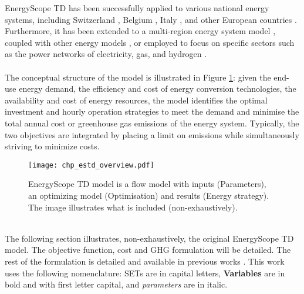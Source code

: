 EnergyScope TD has been successfully applied to various national energy systems, including Switzerland \cite{Limpens_role_2019,limpens2019energyscope}, Belgium \cite{Limpens2020}, Italy \cite{borasio2022deep}, and other European countries \cite{dommisse2020modelling}. Furthermore, it has been extended to a multi-region energy system model \cite{thiran2023validation}, coupled with other energy models \cite{pavivcevic2022bidirectionnal}, or employed to focus on specific sectors such as the power networks of electricity, gas, and hydrogen \cite{schnidrig2023role}.\\

\\

\noindent
The conceptual structure of the model is illustrated in Figure \ref{fig:estd_overview}: given the end-use energy demand, the efficiency and cost of energy conversion technologies, the availability and cost of energy resources, the model identifies the optimal investment and hourly operation strategies to meet the demand and minimise the total annual cost or greenhouse gas emissions of the energy system. Typically, the two objectives are integrated by placing a limit on emissions while simultaneously striving to minimize costs. 

 \begin{figure}[!htbp]
\centering
\texttt{[image: chp\_estd\_overview.pdf]}
\caption{EnergyScope TD model is a flow model with inputs (Parameters), an optimizing model (Optimisation) and results (Energy strategy). The image illustrates what is included (non-exhaustively).}
\label{fig:estd_overview}
\end{figure}


\\

\noindent
The following section illustrates, non-exhaustively, the original EnergyScope TD model. The objective function, cost and \gls{GHG} formulation will be detailed. The rest of the formulation is detailed and available in previous works \cite{limpens2021generating}. 
This work uses the following nomenclature: SETs are in capital letters, \textbf{Variables} are in bold and with first letter capital, and \emph{parameters} are in italic. 

